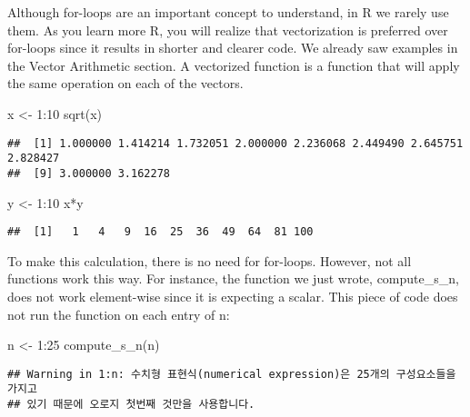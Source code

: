 \documentclass[
]{article}
\newenvironment{Shaded}{\begin{snugshade}}{\end{snugshade}}
\newcommand{\DecValTok}[1]{\textcolor[rgb]{0.00,0.00,0.81}{#1}}
\newcommand{\FunctionTok}[1]{\textcolor[rgb]{0.00,0.00,0.00}{#1}}
\newcommand{\NormalTok}[1]{#1}
\newcommand{\OtherTok}[1]{\textcolor[rgb]{0.56,0.35,0.01}{#1}}
\newcommand{\SpecialCharTok}[1]{\textcolor[rgb]{0.00,0.00,0.00}{#1}}
\begin{document}
Although for-loops are an important concept to understand, in R we
rarely use them. As you learn more R, you will realize that
vectorization is preferred over for-loops since it results in shorter
and clearer code. We already saw examples in the Vector Arithmetic
section. A vectorized function is a function that will apply the same
operation on each of the vectors.

\begin{Shaded}
\begin{Highlighting}[]
\NormalTok{x }\OtherTok{\textless{}{-}} \DecValTok{1}\SpecialCharTok{:}\DecValTok{10}
\FunctionTok{sqrt}\NormalTok{(x)}
\end{Highlighting}
\end{Shaded}

\begin{verbatim}
##  [1] 1.000000 1.414214 1.732051 2.000000 2.236068 2.449490 2.645751 2.828427
##  [9] 3.000000 3.162278
\end{verbatim}

\begin{Shaded}
\begin{Highlighting}[]
\NormalTok{y }\OtherTok{\textless{}{-}} \DecValTok{1}\SpecialCharTok{:}\DecValTok{10}
\NormalTok{x}\SpecialCharTok{*}\NormalTok{y}
\end{Highlighting}
\end{Shaded}

\begin{verbatim}
##  [1]   1   4   9  16  25  36  49  64  81 100
\end{verbatim}

To make this calculation, there is no need for for-loops. However, not
all functions work this way. For instance, the function we just wrote,
compute\_s\_n, does not work element-wise since it is expecting a
scalar. This piece of code does not run the function on each entry of n:

\begin{Shaded}
\begin{Highlighting}[]
\NormalTok{n }\OtherTok{\textless{}{-}} \DecValTok{1}\SpecialCharTok{:}\DecValTok{25}
\FunctionTok{compute\_s\_n}\NormalTok{(n)}
\end{Highlighting}
\end{Shaded}

\begin{verbatim}
## Warning in 1:n: 수치형 표현식(numerical expression)은 25개의 구성요소들을 가지고
## 있기 때문에 오로지 첫번째 것만을 사용합니다.
\end{verbatim}
\end{document}
